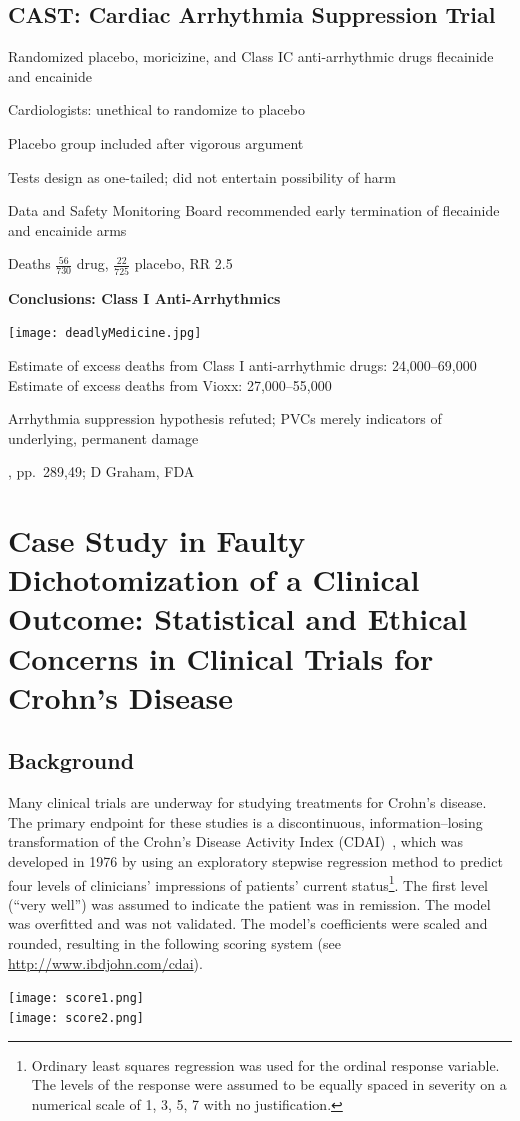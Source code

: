 \subsection{CAST: Cardiac Arrhythmia Suppression Trial}
\bi
\item Randomized placebo, moricizine, and Class IC anti-arrhythmic
drugs flecainide and encainide
\item Cardiologists: unethical to randomize to placebo
\item Placebo group included after vigorous argument
\item Tests design as one-tailed; did not entertain possibility of
harm
\item Data and Safety Monitoring Board recommended early termination
of flecainide and encainide arms
\item Deaths $\frac{56}{730}$ drug, $\frac{22}{725}$ placebo, RR 2.5
\ei
\citet{car89pre}

\textbf{Conclusions: Class I Anti-Arrhythmics}

\centerline{\texttt{[image: deadlyMedicine.jpg]}}

Estimate of excess deaths from Class I anti-arrhythmic drugs: 24,000--69,000\\
Estimate of excess deaths from Vioxx: 27,000--55,000

Arrhythmia suppression hypothesis refuted; PVCs merely indicators of
underlying, permanent damage

\citet{moo95dea}, pp.~289,49; D Graham, FDA

\section{Case Study in Faulty Dichotomization of a Clinical Outcome: Statistical and Ethical Concerns in Clinical Trials for
  Crohn's Disease}\label{sec:crohn}

\subsection{Background}
Many clinical trials are underway for studying treatments for Crohn's disease.
The primary endpoint for these studies is a
discontinuous, information--losing transformation of the Crohn's
Disease Activity Index
(CDAI)~\cite{bes76dev}, which  was developed in 1976 by
using an exploratory stepwise regression method to predict four levels
of clinicians' impressions of patients' current
status\footnote{Ordinary least squares regression was used for the
  ordinal response variable.  The levels of the response were assumed
  to be equally spaced in severity on a numerical
  scale of 1, 3, 5, 7 with no justification.}.  The first
level (``very well'') was assumed to indicate the patient was in
remission.  The model was overfitted and was not validated.  The
model's coefficients were scaled and rounded, resulting in the
following scoring system (see \url{http://www.ibdjohn.com/cdai}).
\clearpage
\begin{center}
\texttt{[image: score1.png]}\\
\texttt{[image: score2.png]}
\end{center}

